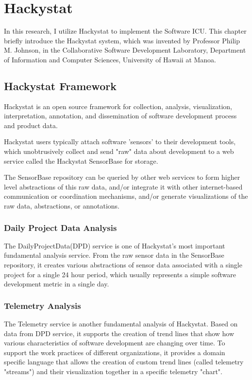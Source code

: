 \chapter{Hackystat}
In this research, I utilize Hackystat to implement the Software ICU. This chapter briefly introduce the Hackystat system, which was invented by Professor Philip M. Johnson, in the Collaborative Software Development Laboratory, Department of Information and Computer Sciences, University of Hawaii at Manoa. 
 

\section{Hackystat Framework}
Hackystat is an open source framework for collection, analysis, visualization, interpretation, annotation, and dissemination of software development process and product data.

Hackystat users typically attach software 'sensors' to their development tools, which unobtrusively collect and send "raw" data about development to a web service called the Hackystat SensorBase for storage.

The SensorBase repository can be queried by other web services to form higher level abstractions of this raw data, and/or integrate it with other internet-based communication or coordination mechanisms, and/or generate visualizations of the raw data, abstractions, or annotations.

\subsection{Daily Project Data Analysis}
The DailyProjectData(DPD) service is one of Hackystat's most important fundamental analysis service. From the raw sensor data in the SensorBase repository, it creates various abstractions of sensor data associated with a single project for a single 24 hour period, which usually represents a simple software development metric in a single day.

\subsection{Telemetry Analysis}
The Telemetry service is another fundamental analysis of Hackystat. Based on data from DPD service, it supports the creation of trend lines that show how various characteristics of software development are changing over time. To support the work practices of different organizations, it provides a domain specific language that allows the creation of custom trend lines (called telemetry "streams") and their visualization together in a specific telemetry "chart". 

